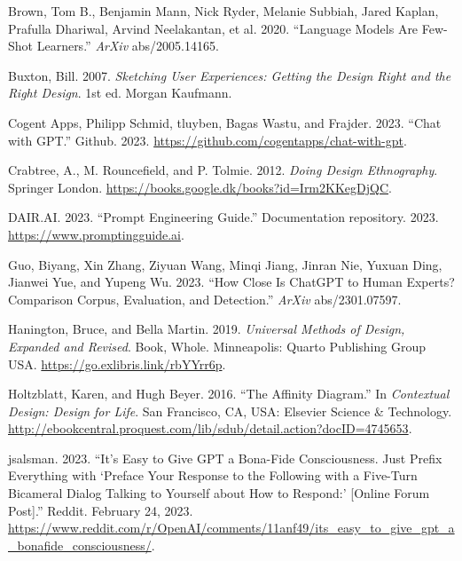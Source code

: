 \documentclass[
]{book}
\newlength{\cslhangindent}
\newlength{\cslentryspacingunit} %
\newenvironment{CSLReferences}[2] %
 {%
  \setlength{\parindent}{0pt}
  \ifodd #1
  \let\oldpar\par
  \def\par{\hangindent=\cslhangindent\oldpar}
  \fi
  \setlength{\parskip}{#2\cslentryspacingunit}
 }%
 {}
\begin{document}
\hypertarget{refs}{}
\begin{CSLReferences}{1}{0}
\leavevmode{}%
Brown, Tom B., Benjamin Mann, Nick Ryder, Melanie Subbiah, Jared Kaplan, Prafulla Dhariwal, Arvind Neelakantan, et al. 2020. {``Language Models Are Few-Shot Learners.''} \emph{ArXiv} abs/2005.14165.

\leavevmode{}%
Buxton, Bill. 2007. \emph{Sketching User Experiences: Getting the Design Right and the Right Design}. 1st ed. Morgan Kaufmann.

\leavevmode{}%
Cogent Apps, Philipp Schmid, tluyben, Bagas Wastu, and Frajder. 2023. {``Chat with GPT.''} Github. 2023. \url{https://github.com/cogentapps/chat-with-gpt}.

\leavevmode{}%
Crabtree, A., M. Rouncefield, and P. Tolmie. 2012. \emph{Doing Design Ethnography}. Springer London. \url{https://books.google.dk/books?id=Irm2KKegDjQC}.

\leavevmode{}%
DAIR.AI. 2023. {``Prompt Engineering Guide.''} Documentation repository. 2023. \url{https://www.promptingguide.ai}.

\leavevmode{}%
Guo, Biyang, Xin Zhang, Ziyuan Wang, Minqi Jiang, Jinran Nie, Yuxuan Ding, Jianwei Yue, and Yupeng Wu. 2023. {``How Close Is ChatGPT to Human Experts? Comparison Corpus, Evaluation, and Detection.''} \emph{ArXiv} abs/2301.07597.

\leavevmode{}%
Hanington, Bruce, and Bella Martin. 2019. \emph{Universal Methods of Design, Expanded and Revised}. Book, Whole. Minneapolis: Quarto Publishing Group USA. \url{https://go.exlibris.link/rbYYrr6p}.

\leavevmode{}%
Holtzblatt, Karen, and Hugh Beyer. 2016. {``The Affinity Diagram.''} In \emph{Contextual Design: Design for Life}. San Francisco, CA, USA: Elsevier Science \& Technology. \url{http://ebookcentral.proquest.com/lib/sdub/detail.action?docID=4745653}.

\leavevmode{}%
jsalsman. 2023. {``It's Easy to Give GPT a Bona-Fide Consciousness. Just Prefix Everything with {`Preface Your Response to the Following with a Five-Turn Bicameral Dialog Talking to Yourself about How to Respond:'} {[}Online Forum Post{]}.''} Reddit. February 24, 2023. \url{https://www.reddit.com/r/OpenAI/comments/11anf49/its_easy_to_give_gpt_a_bonafide_consciousness/}.


\end{CSLReferences}
\end{document}
